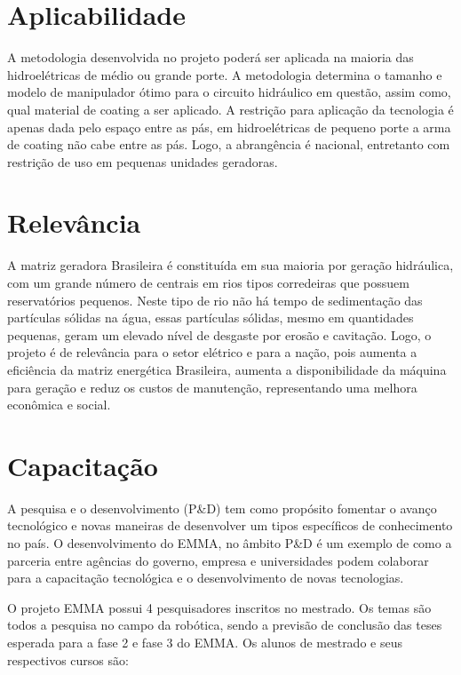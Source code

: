 \section{Aplicabilidade}

A metodologia desenvolvida no projeto  poderá ser aplicada na maioria das
hidroelétricas de médio ou grande porte. A metodologia determina o tamanho e
modelo de manipulador ótimo para o circuito hidráulico em questão, assim como,
qual material de coating a ser aplicado. A restrição para aplicação da tecnologia é
apenas dada pelo espaço entre as pás, em hidroelétricas de pequeno porte a arma
de coating não cabe entre as pás. Logo, a abrangência é nacional, entretanto com
restrição de uso em pequenas unidades geradoras.

\section{Relevância}

A matriz geradora Brasileira é constituída em sua maioria por geração
hidráulica, com um grande número de centrais em rios tipos corredeiras que
possuem reservatórios pequenos. Neste tipo de rio não há tempo de sedimentação
das partículas sólidas na água, essas partículas sólidas, mesmo em quantidades
pequenas, geram um elevado nível de desgaste por erosão e cavitação. Logo, o
projeto é de relevância para o setor elétrico e para a nação, pois aumenta a
eficiência da matriz energética Brasileira, aumenta a disponibilidade da máquina
para geração e reduz os custos de manutenção, representando uma melhora
econômica e social.

\section{Capacitação}

A pesquisa e o desenvolvimento (P\&D) tem como propósito fomentar o avanço
tecnológico e novas maneiras de desenvolver um tipos específicos de conhecimento
no país. O desenvolvimento do EMMA, no âmbito P\&D é um exemplo de como a
parceria entre agências do governo, empresa e universidades podem colaborar para
a capacitação tecnológica e o desenvolvimento de novas tecnologias.

O projeto EMMA possui 4 pesquisadores inscritos no mestrado. Os temas são todos
a pesquisa no campo da robótica, sendo a previsão de conclusão das teses
esperada para a fase 2 e fase 3 do EMMA. Os alunos de mestrado e seus
respectivos cursos são:

